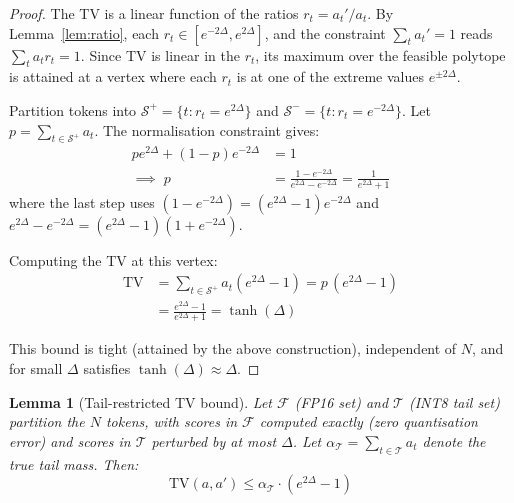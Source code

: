 \documentclass[10pt,twocolumn,a4paper]{article}
\newtheorem{lemma}[theorem]{Lemma}
\theoremstyle{definition}
\theoremstyle{remark}
\begin{document}
\begin{proof}
The TV is a linear function of the ratios $r_t = a_t'/a_t$.  By Lemma~\ref{lem:ratio}, each $r_t \in [e^{-2\Delta}, e^{2\Delta}]$, and the constraint $\sum_t a_t' = 1$ reads $\sum_t a_t r_t = 1$.  Since TV is linear in the $r_t$, its maximum over the feasible polytope is attained at a vertex where each $r_t$ is at one of the extreme values $e^{\pm 2\Delta}$.

Partition tokens into $\mathcal{S}^+ = \{t : r_t = e^{2\Delta}\}$ and $\mathcal{S}^- = \{t : r_t = e^{-2\Delta}\}$.  Let $p = \sum_{t \in \mathcal{S}^+} a_t$.  The normalisation constraint gives:
\begin{align*}
  p e^{2\Delta} + (1{-}p) e^{-2\Delta} &= 1 \\
  \implies\; p &= \frac{1 - e^{-2\Delta}}{e^{2\Delta} - e^{-2\Delta}} = \frac{1}{e^{2\Delta} + 1}
\end{align*}
where the last step uses $(1 - e^{-2\Delta}) = (e^{2\Delta}-1)e^{-2\Delta}$ and $e^{2\Delta} - e^{-2\Delta} = (e^{2\Delta}-1)(1+e^{-2\Delta})$.

Computing the TV at this vertex:
\begin{align*}
  \mathrm{TV}
  &= \sum_{t \in \mathcal{S}^+} a_t(e^{2\Delta} - 1)
   = p\,(e^{2\Delta} - 1) \\
  &= \frac{e^{2\Delta} - 1}{e^{2\Delta} + 1}
   = \tanh(\Delta)
\end{align*}

This bound is tight (attained by the above construction), independent of $N$, and for small $\Delta$ satisfies $\tanh(\Delta) \approx \Delta$.
\end{proof}

\begin{lemma}[Tail-restricted TV bound]
\label{lem:tail_tv}
Let $\mathcal{F}$ (FP16 set) and $\mathcal{T}$ (INT8 tail set) partition the $N$ tokens, with scores in $\mathcal{F}$ computed exactly (zero quantisation error) and scores in $\mathcal{T}$ perturbed by at most $\Delta$.  Let $\alpha_{\mathcal{T}} = \sum_{t \in \mathcal{T}} a_t$ denote the true tail mass.  Then:
\[
  \mathrm{TV}(a, a') \leq \alpha_{\mathcal{T}} \cdot (e^{2\Delta} - 1)
\]
\end{lemma}
\end{document}
